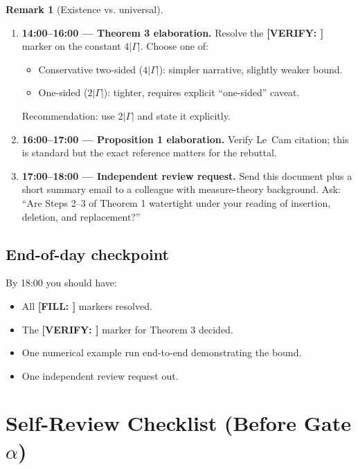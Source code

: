 \documentclass[11pt]{article}
\newcommand{\TODO}[1]{{\color{red}\textbf{[FILL: #1]}}}
\newcommand{\VERIFY}[1]{{\color{orange}\textbf{[VERIFY: #1]}}}
\theoremstyle{plain}
\theoremstyle{definition}
\newtheorem{remark}{Remark}
\begin{document}
\begin{remark}[Existence vs. universal]
\begin{enumerate}[label=\textbf{\arabic*.}, leftmargin=*]
\item \textbf{14:00--16:00 --- Theorem 3 elaboration.} Resolve the \VERIFY{} marker on the constant
$4 |\Gamma|$. Choose one of:
\begin{itemize}
  \item Conservative two-sided ($4|\Gamma|$): simpler narrative, slightly weaker bound.
  \item One-sided ($2|\Gamma|$): tighter, requires explicit ``one-sided'' caveat.
\end{itemize}
Recommendation: use $2|\Gamma|$ and state it explicitly.

\item \textbf{16:00--17:00 --- Proposition 1 elaboration.} Verify Le~Cam citation; this is standard
but the exact reference matters for the rebuttal.

\item \textbf{17:00--18:00 --- Independent review request.} Send this document plus a short summary email
to a colleague with measure-theory background. Ask: ``Are Steps 2--3 of Theorem 1 watertight under
your reading of insertion, deletion, and replacement?''
\end{enumerate}

\subsection{End-of-day checkpoint}

By 18:00 you should have:
\begin{itemize}[noitemsep]
  \item All \TODO{} markers resolved.
  \item The \VERIFY{} marker for Theorem 3 decided.
  \item One numerical example run end-to-end demonstrating the bound.
  \item One independent review request out.
\end{itemize}

\section{Self-Review Checklist (Before Gate $\alpha$)}


\end{remark}
\end{document}
